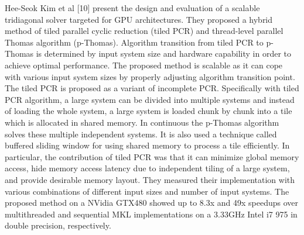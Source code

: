 Hee-Seok Kim et al [10] present the design and evaluation of a scalable tridiagonal solver targeted for GPU architectures. They proposed a hybrid method of tiled parallel cyclic reduction (tiled PCR) and thread-level parallel Thomas algorithm (p-Thomas). Algorithm transition from tiled PCR to p-Thomas is determined by input system size and hardware capability in order to achieve optimal performance. The proposed method is scalable as it can cope with various input system sizes by properly adjusting algorithm transition point. The tiled PCR is proposed as a variant of incomplete PCR. Specifically with tiled PCR algorithm, a large system can be divided into multiple systems and instead of loading the whole system, a large system is loaded chunk by chunk into a tile which is allocated in shared memory. In continuous the p-Thomas algorithm solves these multiple independent systems. It is also used a technique called buffered sliding window for using shared memory to process a tile efficiently. In particular, the contribution of tiled PCR was that it can minimize global memory access, hide memory access latency due to independent tiling of a large system, and provide desirable memory layout. They measured their implementation with various combinations of different input sizes and number of input systems. The proposed method on a NVidia GTX480 showed up to 8.3x and 49x speedups over multithreaded and sequential MKL implementations on a 3.33GHz Intel i7 975 in double precision, respectively.


